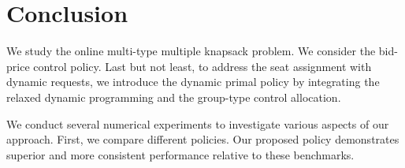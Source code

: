 \section{Conclusion}\label{sec_conclusion}
We study the online multi-type multiple knapsack problem. We consider the bid-price control policy. Last but not least, to address the seat assignment with dynamic requests, we introduce the dynamic primal policy by integrating the relaxed dynamic programming and the group-type control allocation.

We conduct several numerical experiments to investigate various aspects of our approach. First, we compare different policies. Our proposed policy demonstrates superior and more consistent performance relative to these benchmarks. 





